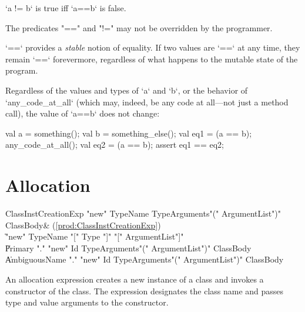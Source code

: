 \xcd`a != b`
is true iff \xcd`a==b` is false.

The predicates \xcd"==" and \xcd"!=" may not be overridden by the programmer.

\xcd`==` provides a {\em stable} notion of equality.  If two values are
\xcd`==` at any time, they remain \xcd`==` forevermore, regardless of what
happens to the mutable state of the program. 

\begin{ex}
Regardless of the values and types of \xcd`a` and \xcd`b`, 
or the behavior of \xcd`any_code_at_all` (which may, indeed, be
any code at all---not just a method call), the value of 
\xcd`a==b` does not change: 
\begin{xten}
val a = something();
val b = something_else();
val eq1 = (a == b);
any_code_at_all();
val eq2 = (a == b);
assert eq1 == eq2;
\end{xten}
\end{ex}



\section{Allocation}
\label{ClassCreation}

\begin{bbgrammar}
ClassInstCreationExp \: \xcd"new" TypeName TypeArguments\opt \xcd"(" ArgumentList\opt \xcd")" ClassBody\opt & (\ref{prod:ClassInstCreationExp}) \\
                    \| \xcd"new" TypeName \xcd"[" Type \xcd"]" \xcd"[" ArgumentList\opt \xcd"]" \\
                    \| Primary \xcd"." \xcd"new" Id TypeArguments\opt \xcd"(" ArgumentList\opt \xcd")" ClassBody\opt \\
                    \| AmbiguousName \xcd"." \xcd"new" Id TypeArguments\opt \xcd"(" ArgumentList\opt \xcd")" ClassBody\opt \\
\end{bbgrammar}

An allocation expression creates a new instance of a class and
invokes a constructor of the class.
The expression designates the class name and passes
type and value arguments to the constructor.

